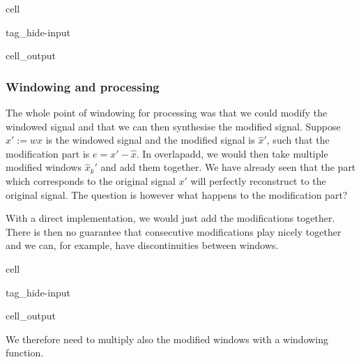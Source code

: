 \documentclass[letterpaper,10pt,english]{jupyterBook}
\begin{document}
\begin{sphinxuseclass}{cell}
\begin{sphinxuseclass}{tag_hide-input}\begin{sphinxVerbatimOutput}

\begin{sphinxuseclass}{cell_output}
\noindent{}

\end{sphinxuseclass}\end{sphinxVerbatimOutput}

\end{sphinxuseclass}
\end{sphinxuseclass}

\subsubsection{Windowing and processing}
\label{\detokenize{Representations/Short-time_processing:windowing-and-processing}}
\sphinxAtStartPar
The whole point of windowing for processing was that we could modify the windowed signal and that we can then synthesise the modified signal. Suppose \(x':=wx\) is the windowed signal and the modified signal is \(\hat x'\), such that the modification part is \(e=x'-\hat x\). In overlap\sphinxhyphen{}add, we would then take multiple modified windows \(\hat x_k'\) and add them together. We have already seen that the part which corresponds to the original signal \(x'\) will perfectly reconstruct to the original signal. The question is however what happens to the modification part?

\sphinxAtStartPar
With a direct implementation, we would just add the modifications together. There is then no guarantee that consecutive modifications play nicely together and we can, for example, have discontinuities between windows.

\begin{sphinxuseclass}{cell}
\begin{sphinxuseclass}{tag_hide-input}\begin{sphinxVerbatimOutput}

\begin{sphinxuseclass}{cell_output}
\noindent{}

\end{sphinxuseclass}\end{sphinxVerbatimOutput}

\end{sphinxuseclass}
\end{sphinxuseclass}
\sphinxAtStartPar
We therefore need to multiply also the modified windows with a windowing function.
\end{document}

